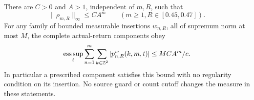 \begin{theorem}
\label{thm:v44-complete-density-bound}
There are $C>0$ and $A>1$, independent of $m,R$, such that
\begin{equation}\label{eq:v44-full-roof-height}
 \|\rho_{m,R}\|_\infty\le CA^m\qquad(m\ge1,
                                      R\in[0.45,0.47]).
\end{equation}
For any family of bounded measurable insertions $w_{n,R}$, all of
supremum norm at most $M$, the complete actual-return components obey
\begin{equation}\label{eq:v44-weighted-height}
 \operatorname*{ess\,sup}_{t}
 \sum_{n=1}^{m}\sum_{k\in\Z^2}
       |p^w_{n,R}(k,m,t)|\le MCA^m/c.
\end{equation}
In particular a prescribed component satisfies this bound with no
regularity condition on its insertion. No source guard or count
cutoff changes the measure in these statements.
\end{theorem}
